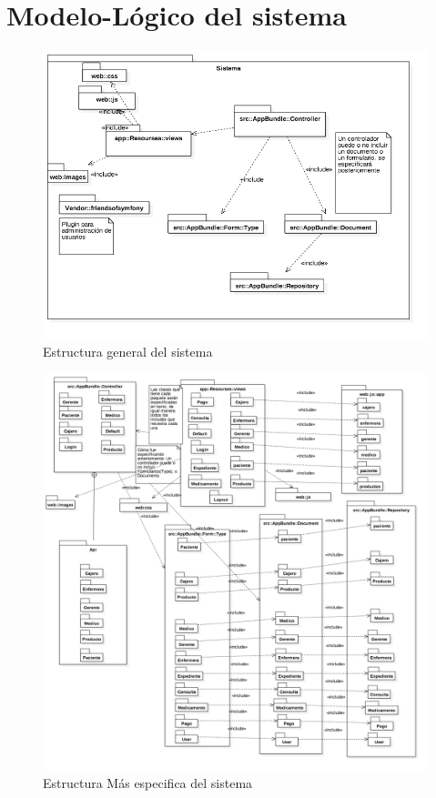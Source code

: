 \section{Modelo-Lógico del sistema}
\begin{figure}[htbp!]
		\centering
			\includegraphics[width=1\textwidth]{images/logico31}
		\caption{Estructura general del sistema}
	\end{figure}

\begin{figure}[htbp!]
		\centering
			\includegraphics[width=1\textwidth]{images/logico32}
		\caption{Estructura Más especifica del sistema}
	\end{figure}
	
